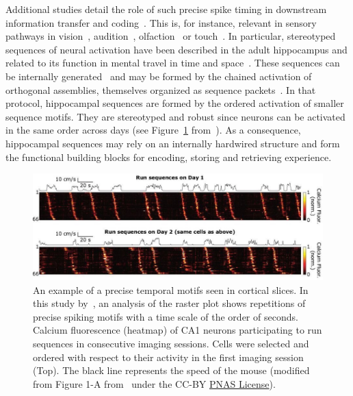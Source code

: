 \documentclass[brainsci, %
               review,accept,pdftex,moreauthors
               ]{Definitions/mdpi}
\begin{document}
Additional studies detail the role of such precise spike timing in downstream information transfer and coding~\citep{villette_internally_2015,branco_dendritic_2010,luczak_packet-based_2015}. This is, for instance, relevant in sensory pathways in vision~\citep{meister_concerted_1995}, audition~\citep{decharms_primary_1996}, olfaction~\citep{cleland_construction_2014, kashiwadani_synchronized_1999, rinberg_speed-accuracy_2006} or touch~\citep{johansson_first_2004}.  In particular, stereotyped sequences of neural activation have been described in the adult hippocampus and related to its function in mental travel in time and space~\citep{buzsaki_space_2018}. These sequences can be internally generated~\citep{pastalkova_internally_2008,villette_internally_2015} and may be formed by the chained activation of orthogonal assemblies, themselves organized as sequence packets~\citep{malvache_awake_2016}. In that protocol, hippocampal sequences are formed by the ordered activation of smaller sequence motifs. They are stereotyped and robust since neurons can be activated in the same order across days (see Figure~\ref{fig:haimerl} from~\citep{haimerl_internal_2019}). As a consequence, hippocampal sequences may rely on an internally hardwired structure and form the functional building blocks for encoding, storing and retrieving experience.
%
\begin{figure}[H]
\includegraphics[width=0.98\linewidth]{figures/haimerl2019.jpg}
\caption{
        An example of a precise temporal motifs seen in cortical slices. 
        In this study by~\citep{haimerl_internal_2019}, an analysis of the raster plot shows repetitions of precise spiking motifs with a time scale of the order of seconds. Calcium fluorescence (heatmap) of CA1 neurons participating to run sequences in consecutive imaging sessions. Cells were selected and ordered with respect to their activity in the first imaging session (Top). The black line represents the speed of the mouse (modified from Figure 1-A from~\citep{haimerl_internal_2019} under the CC-BY \href{https://www.pnas.org/doi/full/10.1073/pnas.1718518116}{PNAS License}).}\label{fig:haimerl}  %

\end{figure}
\end{document}
